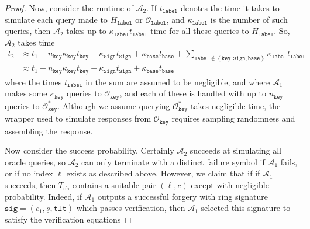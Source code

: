 \documentclass[11pt]{article}
\theoremstyle{definition}
\newcommand{\tlt}{\texttt{tlt}}
\newcommand{\sig}{\texttt{sig}}
\newcommand{\sign}{\texttt{Sign}}
\newcommand{\keyOracle}{\mathcal{O}_{\texttt{key}}}
\begin{document}
\begin{proof}
Now, consider the runtime of $\mathcal{A}_2$. If $t_{\texttt{label}}$ denotes the time it takes to simulate each query made to $H_{\texttt{label}}$ or $\mathcal{O}_{\texttt{label}}$, and $\kappa_{\texttt{label}}$ is the number of such queries, then $\mathcal{A}_2$ takes up to $\kappa_{\texttt{label}}t_{\texttt{label}}$ time for all these queries to $H_{\texttt{label}}$. So, $\mathcal{A}_2$ takes time
\begin{align*}
t_2 &\approx  t_1 + n_{\texttt{key}}\kappa_{\texttt{key}}t_{\texttt{key}} + \kappa_{\sign}t_{\sign} +  \kappa_{\texttt{base}}t_{\texttt{base}} + \sum_{\texttt{label} \notin \left\{\texttt{key}, \sign, \texttt{base}\right\} }\kappa_{\texttt{label}} t_{\texttt{label}} \\
&\approx  t_1 + n_{\texttt{key}}\kappa_{\texttt{key}}t_{\texttt{key}} + \kappa_{\sign}t_{\sign} +  \kappa_{\texttt{base}}t_{\texttt{base}}
\end{align*}where the times $t_{\texttt{label}}$ in the sum are assumed to be negligible, and where $\mathcal{A}_1$ makes some $\kappa_{\texttt{key}}$ queries to $\keyOracle$, and each of these is handled with up to $n_{\texttt{key}}$ queries to $\keyOracle^*$. Although we assume querying $\keyOracle^*$ takes negligible time, the wrapper used to simulate responses from $\keyOracle$ requires sampling randomness and assembling the response. 

Now consider the success probability. Certainly $\mathcal{A}_2$ succeeds at simulating all oracle queries, so $\mathcal{A}_2$ can only terminate with a distinct failure symbol if $\mathcal{A}_1$ fails, or if no index $\ell$ exists as described above.
However, we claim that if if $\mathcal{A}_1$ succeeds, then $T_{\texttt{ch}}$ contains a suitable pair $(\ell,  c)$ except with negligible probability. Indeed, if $\mathcal{A}_1$ outputs a successful forgery with ring signature $\sig = (c_1, \underline{s}, \tlt)$ which passes verification, then $\mathcal{A}_1$ selected this signature to satisfy the verification equations


\end{proof}
\end{document}
